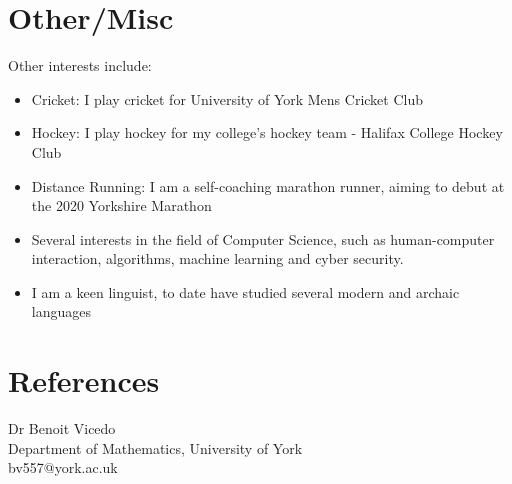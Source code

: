 \documentclass[10pt]{article}
\begin{document}
\section*{Other/Misc}
Other interests include:
\begin{itemize}
    \itemsep=-10pt
    \item Cricket: I play cricket for University of York Mens Cricket Club \\
    \item Hockey: I play hockey for my college's hockey team - Halifax College Hockey Club\\
    \item Distance Running: I am a self-coaching marathon runner, aiming to debut at the 2020 Yorkshire Marathon\\
    \item Several interests in the field of Computer Science, such as human-computer interaction, algorithms, machine learning and cyber security. \\
    \item I am a keen linguist, to date have studied several modern and archaic languages
\end{itemize}


\section*{References}
\begin{minipage}[ht]{0.48\textwidth}
Dr Benoit Vicedo \\
Department of Mathematics, University of York \\
bv557@york.ac.uk
\end{minipage}
\end{document}
